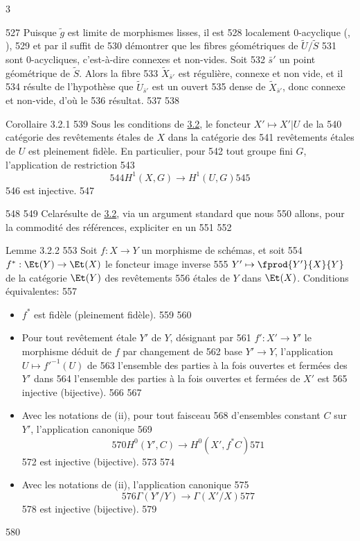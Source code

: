 3	\documentclass[10pt]{../fichiers-configuration-latex/smfart}
\begin{document}
   527	Puisque $\widetilde{g}$ est limite de morphismes lisses, il est
   528	localement $0$-acyclique (, ), 
   529	et par  il suffit de
   530	démontrer que les fibres géométriques de $\widetilde{U}/\widetilde{S}$
   531	sont $0$-acycliques, c'est-à-dire connexes et non-vides. Soit
   532	$\bar{s}'$ un point géométrique de $\widetilde{S}$. Alors la fibre
   533	$\widetilde{X}_{\bar{s}'}$ est régulière, connexe et non vide, et il
   534	résulte de l'hypothèse que $\widetilde{U}_{\bar{s}'}$ est un ouvert
   535	dense de $\widetilde{X}_{\bar{s}'}$, donc connexe et non-vide, d'où le
   536	résultat.
   537	
   538	\begin{enonce*}{Corollaire 3.2.1}
   539	Sous les conditions de \hyperref[XVI.prop3.2]{3.2}, le foncteur $X'\mapsto X'|U$ de la
   540	catégorie des revêtements étales de $X$ dans la catégorie des
   541	revêtements étales de $U$ est pleinement fidèle. En particulier, pour
   542	tout groupe fini $G$, l'application de restriction
   543	$$
   544	H^{1}(X,G)\longrightarrow H^{1}(U,G)
   545	$$
   546	est injective. 
   547	\end{enonce*}
   548	  
   549	Cela\pageoriginale résulte de \hyperref[XVI.prop3.2]{3.2}, via un argument standard que nous
   550	allons, pour la commodité des références, expliciter en un 
   551	
   552	\begin{enonce*}{Lemme 3.2.2}
   553	Soit $f:X\rightarrow Y$ un morphisme de schémas, et soit
   554	$f^{\ast}:\Et(Y)\rightarrow \Et(X)$ le foncteur image inverse
   555	$Y'\mapsto \fprod{Y'}{X}{Y}$ de la catégorie $\Et(Y)$ des revêtements
   556	étales de $Y$ dans $\Et(X)$. Conditions équivalentes:
   557	\begin{itemize}
   558	\item[(i)] $f^{\ast}$ est fidèle (\resp pleinement fidèle).
   559	
   560	\item[(ii)] Pour tout revêtement étale $Y'$ de $Y$, désignant par
   561	  $f':X'\rightarrow Y'$ le morphisme déduit de $f$ par changement de
   562	  base $Y'\rightarrow Y$, l'application $U\mapsto {f'}^{-1}(U)$ de
   563	  l'ensemble des parties à la fois ouvertes et fermées des $Y'$ dans
   564	  l'ensemble des parties à la fois ouvertes et fermées de $X'$ est
   565	  injective (\resp bijective).
   566	
   567	\item[(ii bis)] Avec les notations de {\rm(ii)}, pour tout faisceau
   568	  d'ensembles constant $C$ sur $Y'$, l'application canonique
   569	$$
   570	H^{0}(Y',C)\longrightarrow H^{0}(X',f^{\ast}C)
   571	$$
   572	est injective (\resp bijective).
   573	
   574	\item[(iii)] Avec les notations de {\rm(ii)}, l'application canonique
   575	$$
   576	\Gamma(Y'/Y)\longrightarrow \Gamma(X'/X)
   577	$$
   578	est injective (\resp bijective).
   579	\end{itemize}
   580	\end{enonce*}
\end{document}
